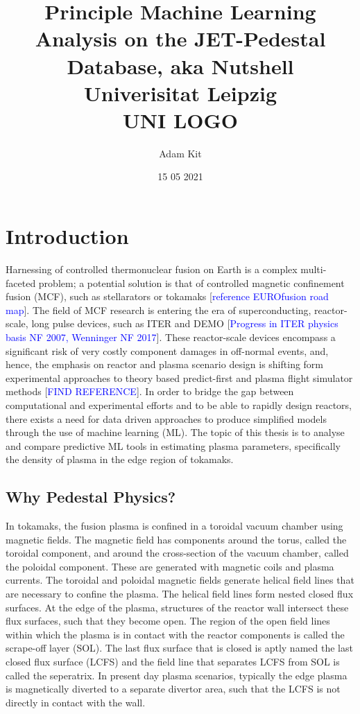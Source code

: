 \documentclass[a4paper, twoside, final, 12pt]{article}
\title{
	{Principle Machine Learning Analysis on the JET-Pedestal Database, aka Nutshell} \\ 
	{\large Univerisitat Leipzig} \\
	{ UNI LOGO } \\ 
	}
\author{Adam Kit}
\date{15 05 2021}
\begin{document}
    \maketitle
    \newpage
    \tableofcontents
    \newpage
\section{Introduction}\label{sec:introduction}
Harnessing of controlled thermonuclear fusion on Earth is a complex multi-faceted problem; a potential solution is that of controlled magnetic confinement fusion (MCF), such as stellarators or tokamaks [\textcolor{blue}{reference EUROfusion road map}].
The field of MCF research is entering the era of superconducting, reactor-scale, long pulse devices, such as ITER and DEMO [\textcolor{blue}{Progress in ITER physics basis NF 2007, Wenninger NF 2017}].
These reactor-scale devices encompass a significant risk of very costly component damages in off-normal events, and, hence, the emphasis on reactor and plasma scenario design is shifting form experimental approaches to theory based predict-first and plasma flight simulator methods [\textcolor{blue}{FIND REFERENCE}].
In order to bridge the gap between computational and experimental efforts and to be able to rapidly design reactors, there exists a need for data driven approaches to produce simplified models through the use of machine learning (ML).
The topic of this thesis is to analyse and compare predictive ML tools in estimating plasma parameters, specifically the density of plasma in the edge region of tokamaks.

\subsection{Why Pedestal Physics?}\label{subsec:purpose}
In tokamaks, the fusion plasma is confined in a toroidal vacuum chamber using magnetic fields.
The magnetic field has components around the torus, called the toroidal component, and around the cross-section of the vacuum chamber, called the poloidal component.
These are generated with magnetic coils and plasma currents.
The toroidal and poloidal magnetic fields generate helical field lines that are necessary to confine the plasma.
The helical field lines form nested closed flux surfaces.
At the edge of the plasma, structures of the reactor wall intersect these flux surfaces, such that they become open.
The region of the open field lines within which the plasma is in contact with the reactor components is called the scrape-off layer (SOL).
The last flux surface that is closed is aptly named the last closed flux surface (LCFS) and the field line that separates LCFS from SOL is called the seperatrix.
In present day plasma scenarios, typically the edge plasma is magnetically diverted to a separate divertor area, such that the LCFS is not directly in contact with the wall.
\end{document}
